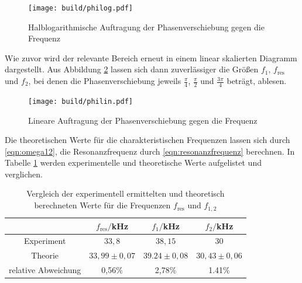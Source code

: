 \begin{figure}
  \centering
  \texttt{[image: build/philog.pdf]}
  \caption{Halblogarithmische Auftragung der Phasenverschiebung gegen die Frequenz}
  \label{fig:philog}
\end{figure}

Wie zuvor wird der relevante Bereich erneut in einem linear skalierten Diagramm
dargestellt. Aus Abbildung \ref{fig:philin} lassen sich dann zuverlässiger die Größen
$f_1$, $f_\text{res}$ und $f_2$, bei denen die Phasenverschiebung jeweils $\frac{\pi}{4}$,
$\frac{\pi}{2}$ und $\frac{3\pi}{4}$ beträgt, ablesen.

\begin{figure}
  \centering
  \texttt{[image: build/philin.pdf]}
  \caption{Lineare Auftragung der Phasenverschiebung gegen die Frequenz}
  \label{fig:philin}
\end{figure}

Die theoretischen Werte für die charakteristischen Frequenzen lassen sich durch
\eqref{eqn:omega12}, die Resonanzfrequenz durch \eqref{eqn:resonanzfrequenz} berechnen. In Tabelle \ref{tab:frequenzvergleich} werden experimentelle und theoretische
Werte aufgelistet und verglichen.
\begin{table}
\centering
\begin{tabular}{cccc}
\toprule
& $f_\mathrm{res}/$kHz & $f_1/$kHz & $f_2/$kHz \\
\midrule
Experiment & $33,8$ & $38,15$ & $30$\\
Theorie & $33,99 \pm 0,07 $ & $ 39.24 \pm 0,08$ & $30,43 \pm 0,06$ \\
\hline
relative Abweichung & 0,56\% & 2,78\% & 1.41\%\\
\bottomrule
\end{tabular}
\caption{Vergleich der experimentell ermittelten und theoretisch berechneten Werte für die Frequenzen $f_\mathrm{res}$ und $f_{1,2}$}
\label{tab:frequenzvergleich}
\end{table}
